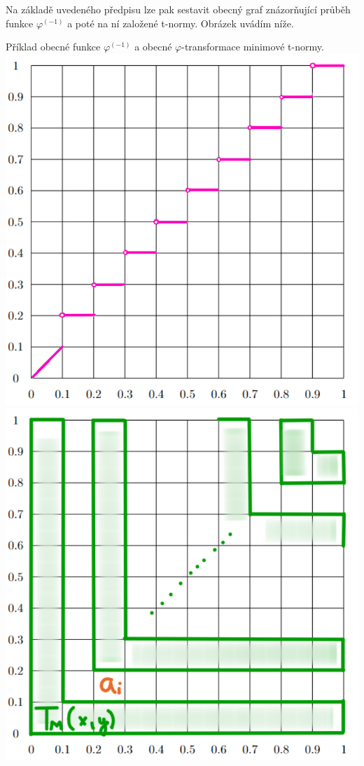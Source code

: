 Na základě uvedeného předpisu lze pak sestavit obecný graf znázor\v nující pr\r uběh funkce $\varphi^{(-1)}$ a poté na ní založené t-normy. Obrázek uvádím níže.
\begin{graph}
    Příklad obecné funkce $\varphi^{(-1)}$ a obecné $\varphi$-transformace minimové t-normy.\\
    \centering
        \includegraphics[scale=0.4]{template-fig/basic.pdf}
        \centering
        \includegraphics[scale=0.4]{template-fig/t-norma.pdf}

\end{graph}
